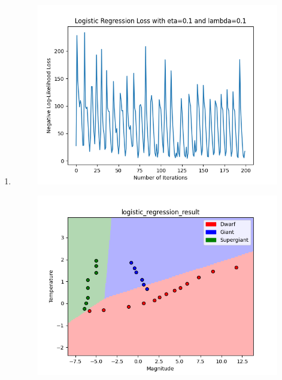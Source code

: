 \documentclass[submit]{harvardml}
\begin{document}
\begin{enumerate}

\item 
\newpage
\begin{figure}[h]
\includegraphics[scale=0.8]{logistic_regression_loss.png}
\centering
\end{figure}

\newpage
\begin{figure}[h]
\includegraphics[scale=0.8]{logistic_regression_result.png}
\centering
\end{figure}


\end{enumerate}

\newpage
\end{document}
